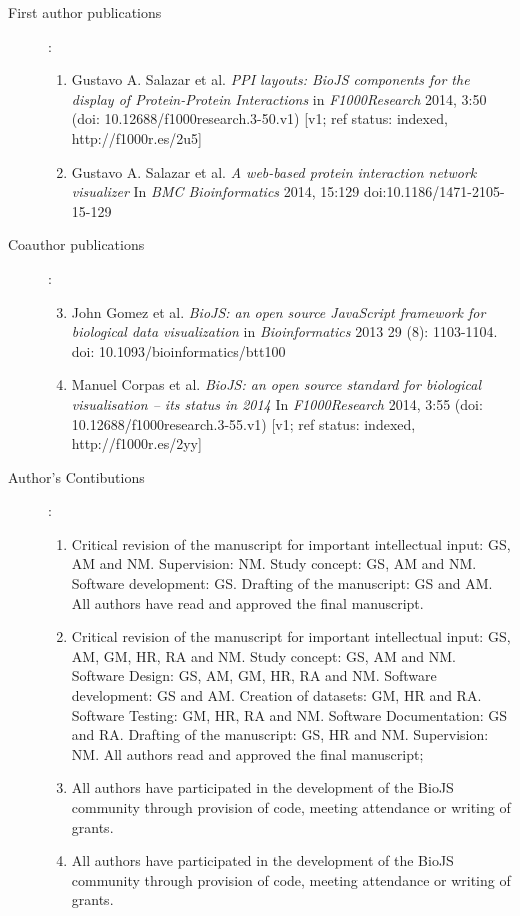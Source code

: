 \begin{description}
	\item[First author publications]:\\
		\begin{enumerate}
			\item Gustavo A. Salazar et al. \emph{PPI layouts: BioJS components for the display of Protein-Protein Interactions} in  \emph{F1000Research} 2014, 3:50 (doi: 10.12688/f1000research.3-50.v1) [v1; ref status: indexed, http://f1000r.es/2u5]
			\item Gustavo A. Salazar et al. \emph{A web-based protein interaction network visualizer} In \emph{BMC Bioinformatics} 2014, 15:129  doi:10.1186/1471-2105-15-129
		\end{enumerate}

	\item[Coauthor publications]:\\
		\begin{enumerate}
			\setcounter{enumi}{2}
			\item John Gomez et al. \emph{BioJS: an open source JavaScript framework for biological data visualization} in  \emph{Bioinformatics}  2013 29 (8): 1103-1104. doi: 10.1093/bioinformatics/btt100
			\item Manuel Corpas et al. \emph{BioJS: an open source standard for biological visualisation – its status in 2014} In \emph{F1000Research} 2014, 3:55 (doi: 10.12688/f1000research.3-55.v1)  [v1; ref status: indexed, http://f1000r.es/2yy]
		\end{enumerate}
 
	\item[Author's Contibutions]:\\
		\begin{enumerate}
			\item Critical revision of the manuscript for important intellectual input: GS, AM and NM. Supervision: NM. Study concept: GS, AM and NM. Software development: GS. Drafting of the manuscript: GS and AM. All authors have read and approved the final manuscript.
			\item Critical revision of the manuscript for important intellectual input: GS, AM, GM, HR, RA and NM. Study concept: GS, AM and NM. Software Design: GS, AM, GM, HR, RA and NM. Software development: GS and AM. Creation of datasets: GM, HR and RA. Software Testing: GM, HR, RA and NM. Software Documentation: GS and RA. Drafting of the manuscript: GS, HR and NM. Supervision: NM. All authors read and approved the final manuscript;
			\item All authors have participated in the development of the BioJS community through provision of code, meeting attendance or writing of grants.
			\item All authors have participated in the development of the BioJS community through provision of code, meeting attendance or writing of grants.
		\end{enumerate}
\end{description}


